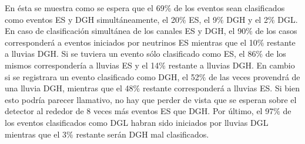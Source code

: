 	En \'esta se muestra como se espera que el 69$\%$ de los eventos sean clasificados como eventos ES y DGH simult\'aneamente, el 20$\%$ ES, el 9$\%$ DGH y el 2$\%$ DGL.
	En caso de clasificación simultánea de los canales ES y DGH, el 90$\%$ de los casos corresponderá a eventos iniciados por neutrinos ES mientras que el 10$\%$ restante a lluvias DGH. 
	Si se tuviera un evento sólo clasificado como ES, el 86$\%$ de los mismos correspondería a lluvias ES y el 14$\%$ restante a lluvias DGH.
	En cambio si se registrara un evento clasificado como DGH, el 52$\%$ de las veces provendrá de una lluvia DGH, mientras que el 48$\%$ restante corresponderá a lluvias ES. 
	Si bien esto podría parecer llamativo, no hay que perder de vista que se esperan sobre el detector al rededor de 8 veces más eventos ES que DGH.
	Por último, el 97$\%$ de los eventos clasificados como DGL habran sido iniciados por lluvias DGL mientras que el 3$\%$ restante serán DGH mal clasificados.
	
	
%	
% 
% 
	
